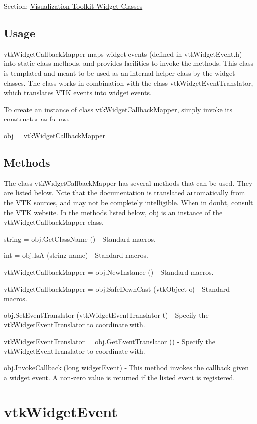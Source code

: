 Section\-: \hyperlink{sec_vtkwidgets}{Visualization Toolkit Widget Classes} \hypertarget{vtkwidgets_vtkxyplotwidget_Usage}{}\subsection{Usage}\label{vtkwidgets_vtkxyplotwidget_Usage}
vtk\-Widget\-Callback\-Mapper maps widget events (defined in vtk\-Widget\-Event.\-h) into static class methods, and provides facilities to invoke the methods. This class is templated and meant to be used as an internal helper class by the widget classes. The class works in combination with the class vtk\-Widget\-Event\-Translator, which translates V\-T\-K events into widget events.

To create an instance of class vtk\-Widget\-Callback\-Mapper, simply invoke its constructor as follows \begin{DoxyVerb}  obj = vtkWidgetCallbackMapper
\end{DoxyVerb}
 \hypertarget{vtkwidgets_vtkxyplotwidget_Methods}{}\subsection{Methods}\label{vtkwidgets_vtkxyplotwidget_Methods}
The class vtk\-Widget\-Callback\-Mapper has several methods that can be used. They are listed below. Note that the documentation is translated automatically from the V\-T\-K sources, and may not be completely intelligible. When in doubt, consult the V\-T\-K website. In the methods listed below, {\ttfamily obj} is an instance of the vtk\-Widget\-Callback\-Mapper class. 
\begin{DoxyItemize}
\item {\ttfamily string = obj.\-Get\-Class\-Name ()} -\/ Standard macros.  
\item {\ttfamily int = obj.\-Is\-A (string name)} -\/ Standard macros.  
\item {\ttfamily vtk\-Widget\-Callback\-Mapper = obj.\-New\-Instance ()} -\/ Standard macros.  
\item {\ttfamily vtk\-Widget\-Callback\-Mapper = obj.\-Safe\-Down\-Cast (vtk\-Object o)} -\/ Standard macros.  
\item {\ttfamily obj.\-Set\-Event\-Translator (vtk\-Widget\-Event\-Translator t)} -\/ Specify the vtk\-Widget\-Event\-Translator to coordinate with.  
\item {\ttfamily vtk\-Widget\-Event\-Translator = obj.\-Get\-Event\-Translator ()} -\/ Specify the vtk\-Widget\-Event\-Translator to coordinate with.  
\item {\ttfamily obj.\-Invoke\-Callback (long widget\-Event)} -\/ This method invokes the callback given a widget event. A non-\/zero value is returned if the listed event is registered.  
\end{DoxyItemize}\hypertarget{vtkwidgets_vtkwidgetevent}{}\section{vtk\-Widget\-Event}\label{vtkwidgets_vtkwidgetevent}
